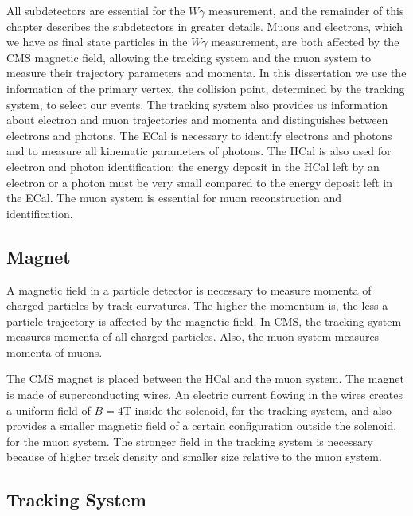 All subdetectors are essential for the $W\gamma$ measurement, and the remainder of this chapter describes the subdetectors in greater details. Muons and electrons, which we have as final state particles in the $W\gamma$ measurement, are both affected by the CMS magnetic field, allowing the tracking system and the muon system to measure their trajectory parameters and momenta. In this dissertation we use the information of the primary vertex, the collision point, determined by the tracking system, to select our events. The tracking system also provides us information about electron and muon trajectories and momenta and distinguishes between electrons and photons. The ECal is necessary to identify electrons and photons and to measure all kinematic parameters of photons. The HCal is also used for electron and photon identification: the energy deposit in the HCal left by an electron or a photon must be very small compared to the energy deposit left in the ECal. The muon system is essential for muon reconstruction and identification.

\subsection{Magnet}

A magnetic field in a particle detector is necessary to measure momenta of charged particles by track curvatures. The higher the momentum is, the less a particle trajectory is affected by the magnetic field. In CMS, the tracking system measures  momenta of all charged particles. Also, the muon system measures momenta of muons. 

The CMS magnet is placed between the HCal and the muon system. The magnet is made of superconducting wires. An electric current flowing in the wires creates a uniform field of $B=4$T inside the solenoid, for the tracking system, and also provides a smaller magnetic field of a certain configuration outside the solenoid, for the muon system. The stronger field in the tracking system is necessary because of higher track density and smaller size relative to the muon system.

\subsection{Tracking System}

